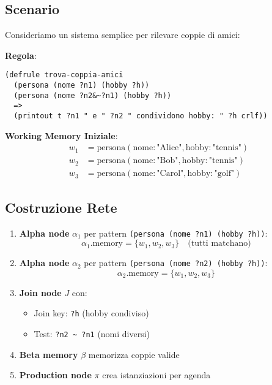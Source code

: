 \subsection{Scenario}

Consideriamo un sistema semplice per rilevare coppie di amici:

\textbf{Regola}:
\begin{lstlisting}[language=CLIPS]
(defrule trova-coppia-amici
  (persona (nome ?n1) (hobby ?h))
  (persona (nome ?n2&~?n1) (hobby ?h))
  =>
  (printout t ?n1 " e " ?n2 " condividono hobby: " ?h crlf))
\end{lstlisting}

\textbf{Working Memory Iniziale}:
\begin{align*}
w_1 &= \text{persona}(\text{nome}: \text{"Alice"}, \text{hobby}: \text{"tennis"})\\
w_2 &= \text{persona}(\text{nome}: \text{"Bob"}, \text{hobby}: \text{"tennis"})\\
w_3 &= \text{persona}(\text{nome}: \text{"Carol"}, \text{hobby}: \text{"golf"})
\end{align*}

\subsection{Costruzione Rete}

\begin{enumerate}
\item \textbf{Alpha node} $\alpha_1$ per pattern \texttt{(persona (nome ?n1) (hobby ?h))}:
\begin{equation}
\alpha_1.\text{memory} = \{w_1, w_2, w_3\} \quad \text{(tutti matchano)}
\end{equation}

\item \textbf{Alpha node} $\alpha_2$ per pattern \texttt{(persona (nome ?n2) (hobby ?h))}:
\begin{equation}
\alpha_2.\text{memory} = \{w_1, w_2, w_3\}
\end{equation}

\item \textbf{Join node} $J$ con:
\begin{itemize}
\item Join key: \texttt{?h} (hobby condiviso)
\item Test: \texttt{?n2 \~{} ?n1} (nomi diversi)
\end{itemize}

\item \textbf{Beta memory} $\beta$ memorizza coppie valide

\item \textbf{Production node} $\pi$ crea istanziazioni per agenda
\end{enumerate}

